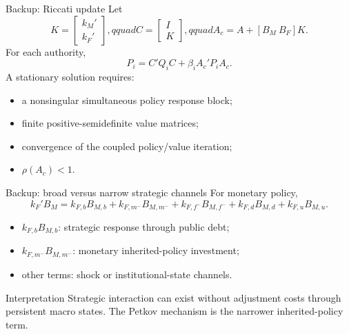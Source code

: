 \documentclass[10pt,aspectratio=169]{beamer}
\begin{document}
\begin{frame}{Backup: Riccati update}
Let
\begin{equation*}
K=\begin{bmatrix}k_M'\\k_F'\end{bmatrix},qquad
C=\begin{bmatrix}I\\K\end{bmatrix},qquad
A_c=A+[B_M\ B_F]K.
\end{equation*}
For each authority,
\begin{equation*}
P_i=C'Q_iC+\beta_iA_c'P_iA_c.
\end{equation*}
A stationary solution requires:
\begin{itemize}
  \item a nonsingular simultaneous policy response block;
  \item finite positive-semidefinite value matrices;
  \item convergence of the coupled policy/value iteration;
  \item $\rho(A_c)<1$.
\end{itemize}
\end{frame}

\begin{frame}{Backup: broad versus narrow strategic channels}
For monetary policy,
\begin{equation*}
k_F'B_M
=k_{F,b}B_{M,b}
+k_{F,m^-}B_{M,m^-}
+k_{F,f^-}B_{M,f^-}
+k_{F,d}B_{M,d}
+k_{F,u}B_{M,u}.
\end{equation*}
\begin{itemize}
  \item $k_{F,b}B_{M,b}$: strategic response through public debt;
  \item $k_{F,m^-}B_{M,m^-}$: monetary inherited-policy investment;
  \item other terms: shock or institutional-state channels.
\end{itemize}
\begin{alertblock}{Interpretation}
Strategic interaction can exist without adjustment costs through persistent
macro states. The Petkov mechanism is the narrower inherited-policy term.
\end{alertblock}
\end{frame}
\end{document}
